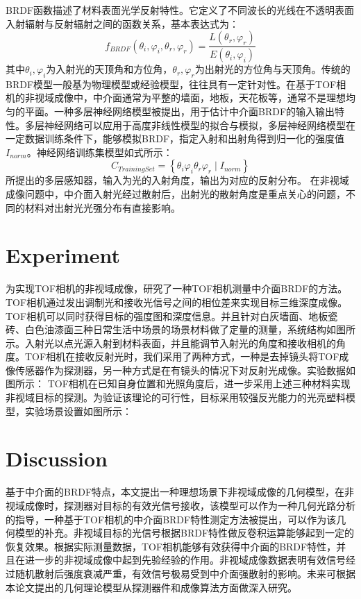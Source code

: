 \documentclass[sensors,article,accept,moreauthors,pdftex,10pt,a4paper]{mdpi}
\begin{document}
BRDF函数描述了材料表面光学反射特性。它定义了不同波长的光线在不透明表面入射辐射与反射辐射之间的函数关系，基本表达式为：
\begin{equation}
 f_{BRDF}\left(\theta _i, \varphi _i, \theta _r, \varphi _r\right)=\frac{L\left(\theta _r, \varphi _r\right)}{E\left(\theta _i, \varphi _i\right)}
\end{equation}
其中$\theta _i, \varphi _i$为入射光的天顶角和方位角，$\theta _r, \varphi _r$为出射光的方位角与天顶角。传统的BRDF模型一般基为物理模型或经验模型，往往具有一定针对性。在基于TOF相机的非视域成像中，中介面通常为平整的墙面，地板，天花板等，通常不是理想均匀的平面。一种多层神经网络模型被提出，用于估计中介面BRDF的输入输出特性。多层神经网络可以应用于高度非线性模型的拟合与模拟，多层神经网络模型在一定数据训练条件下，能够模拟BRDF，指定入射和出射角得到归一化的强度值$I_{norm}$。神经网络训练集模型如式所示：
\begin{equation}
  C_{TrainingSet}=\left\{\theta _i \varphi _i \theta _r \varphi _r \mid I_{norm}\right\}
\end{equation}
所提出的多层感知器，输入为光的入射角度，输出为对应的反射分布。
在非视域成像问题中，中介面入射光经过散射后，出射光的散射角度是重点关心的问题，不同的材料对出射光光强分布有直接影响。 
\section{Experiment}%
\label{sect:Experiment}
为实现TOF相机的非视域成像，研究了一种TOF相机测量中介面BRDF的方法。TOF相机通过发出调制光和接收光信号之间的相位差来实现目标三维深度成像。TOF相机可以同时获得目标的强度图和深度信息。并且针对白灰墙面、地板瓷砖、白色油漆面三种日常生活中场景的场景材料做了定量的测量，系统结构如图所示。入射光以点光源入射到材料表面，并且能调节入射光的角度和接收相机的角度。TOF相机在接收反射光时，我们采用了两种方式，一种是去掉镜头将TOF成像传感器作为探测器，另一种方式是在有镜头的情况下对反射光成像。实验数据如图所示：
TOF相机在已知自身位置和光照角度后，进一步采用上述三种材料实现非视域目标的探测。为验证该理论的可行性，目标采用较强反光能力的光亮塑料模型，实验场景设置如图所示：

\section{Discussion}
\label{sect:Discussion}
基于中介面的BRDF特点，本文提出一种理想场景下非视域成像的几何模型，在非视域成像时，探测器对目标的有效光信号接收，该模型可以作为一种几何光路分析的指导，一种基于TOF相机的中介面BRDF特性测定方法被提出，可以作为该几何模型的补充。非视域目标的光信号根据BRDF特性做反卷积运算能够起到一定的恢复效果。根据实际测量数据，TOF相机能够有效获得中介面的BRDF特性，并且在进一步的非视域成像中起到先验经验的作用。非视域成像数据表明有效信号经过随机散射后强度衰减严重，有效信号极易受到中介面强散射的影响。未来可根据本论文提出的几何理论模型从探测器件和成像算法方面做深入研究。
\end{document}
